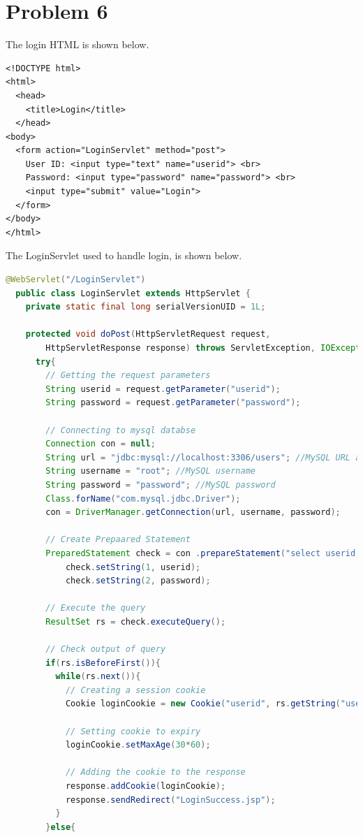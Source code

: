 \documentclass{article}
\begin{document}
\section{Problem 6}
The login HTML is shown below.
\begin{lstlisting}[style=htmlcssjs]
<!DOCTYPE html>
<html>
  <head>
    <title>Login</title>
  </head>
<body>
  <form action="LoginServlet" method="post">
    User ID: <input type="text" name="userid"> <br>
    Password: <input type="password" name="password"> <br>
    <input type="submit" value="Login">
  </form>
</body>
</html>
\end{lstlisting}

The LoginServlet used to handle login, is shown below.
\begin{lstlisting}[language=java]
  @WebServlet("/LoginServlet")
  public class LoginServlet extends HttpServlet {
    private static final long serialVersionUID = 1L;
  
    protected void doPost(HttpServletRequest request,
        HttpServletResponse response) throws ServletException, IOException {
      try{
        // Getting the request parameters
        String userid = request.getParameter("userid");
        String password = request.getParameter("password");
        
        // Connecting to mysql databse
        Connection con = null;
        String url = "jdbc:mysql://localhost:3306/users"; //MySQL URL and followed by the database name
        String username = "root"; //MySQL username
        String password = "password"; //MySQL password
        Class.forName("com.mysql.jdbc.Driver");
        con = DriverManager.getConnection(url, username, password);

        // Create Prepaared Statement
        PreparedStatement check = con .prepareStatement("select userid, password from data where userid=? and password=?");
 		    check.setString(1, userid);
 		    check.setString(2, password);

        // Execute the query
        ResultSet rs = check.executeQuery();
        
        // Check output of query
        if(rs.isBeforeFirst()){
          while(rs.next()){
            // Creating a session cookie
            Cookie loginCookie = new Cookie("userid", rs.getString("userid"));

            // Setting cookie to expiry
            loginCookie.setMaxAge(30*60);

            // Adding the cookie to the response
            response.addCookie(loginCookie);
            response.sendRedirect("LoginSuccess.jsp");
          }
        }else{


\end{lstlisting}
\end{document}
